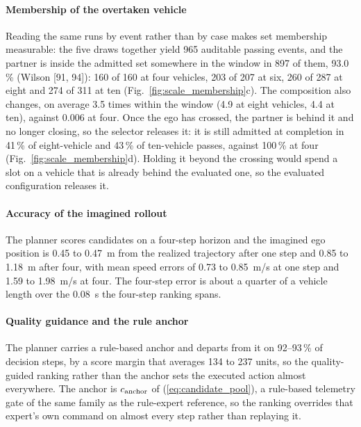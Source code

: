 \documentclass[journal]{IEEEtran}
\begin{document}
\paragraph{Membership of the overtaken vehicle}
Reading the same runs by event rather than by case makes set membership
measurable: the five draws together yield 965 auditable passing events, and the
partner is inside the admitted set somewhere in the window in 897 of them,
93.0\,\% (Wilson [91, 94]): 160 of 160 at four vehicles, 203 of 207 at six, 260
of 287 at eight and 274 of 311 at ten (Fig.~\ref{fig:scale_membership}c). The
composition also changes, on average 3.5 times within the window (4.9 at eight
vehicles, 4.4 at ten), against 0.006 at four. Once the ego has crossed, the
partner is behind it and no longer closing, so the selector releases it: it is
still admitted at completion in 41\,\% of eight-vehicle and 43\,\% of ten-vehicle
passes, against 100\,\% at four (Fig.~\ref{fig:scale_membership}d). Holding it
beyond the crossing would spend a slot on a vehicle that is already behind the
evaluated one, so the evaluated configuration releases it.

\paragraph{Accuracy of the imagined rollout}
The planner scores candidates on a four-step horizon and the imagined ego
position is 0.45 to 0.47~m from the realized trajectory after one step and 0.85
to 1.18~m after four, with mean speed errors of 0.73 to 0.85~m/s at one step and
1.59 to 1.98~m/s at four. The four-step error is about a quarter of a
vehicle length over the $0.08$~s the four-step ranking spans.

\paragraph{Quality guidance and the rule anchor}
The planner carries a rule-based anchor and departs from it on 92--93\,\% of
decision steps, by a score margin that averages 134 to 237 units, so the
quality-guided ranking rather than the anchor sets the executed action almost
everywhere. The anchor is $c_{\rm anchor}$ of (\ref{eq:candidate_pool}), a
rule-based telemetry gate of the same family as the rule-expert reference, so
the ranking overrides that expert's own command on almost every step rather
than replaying it.
\end{document}
